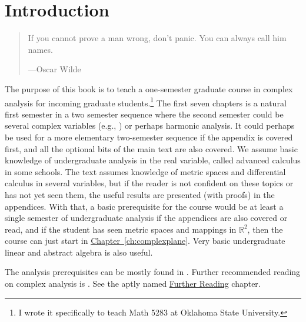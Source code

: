 \documentclass[12pt,openany]{book}
\newcommand{\R}{{\mathbb{R}}}
\theoremstyle{plain}
\theoremstyle{remark}
\theoremstyle{definition}
\newenvironment{myepigraph}{%
    \begin{quote}%
    \begingroup\itshape
}{%
    \endgroup%
    \end{quote}
}
\theoremstyle{exercise}
\theoremstyle{example}
\newcommand{\Chapterref}[1]{\hyperref[#1]{Chapter~\ref*{#1}}}
\begin{document}

\chapter*{Introduction} \label{ch:intro}

\begin{myepigraph}
If you cannot prove a man wrong, don't panic. You can always call him names.

---Oscar Wilde 
\end{myepigraph}

The purpose of this book is to teach a one-semester graduate course in
complex analysis for incoming graduate students.\footnote{I wrote it
specifically to teach Math 5283 at Oklahoma State University.}
The first seven chapters is a natural first semester in a two semester sequence where the second
semester could be several complex variables (e.g., \cite{scv:book})
or perhaps harmonic analysis.
It could perhaps be used for a more elementary two-semester sequence if the
appendix is covered first, and all the optional bits of the main text are
also covered.
We assume basic knowledge of undergraduate
analysis in the real variable, called advanced calculus in some schools.
The text assumes knowledge of metric spaces
and differential calculus in several variables, but if the reader is not
confident on these topics or has not yet seen them, the useful results
are presented (with proofs) in the appendices.
With that, a basic prerequisite for the
course would be at least a single semester of undergraduate analysis if the
appendices are also covered or read, and if the student has
seen metric spaces and mappings in $\R^2$, then the course
can just start in \Chapterref{ch:complexplane}.  Very basic undergraduate
linear and abstract algebra is also useful.

The analysis prerequisites can be mostly found in
\cites{ra:book,ra:book2,Rudin:principles}.  Further recommended
reading on complex analysis is \cites{Boas,Conway1,Conway2,Rudin,Ullrich}.
See the aptly named
\hyperref[ch:furtherreading]{Further Reading} chapter.
\end{document}
